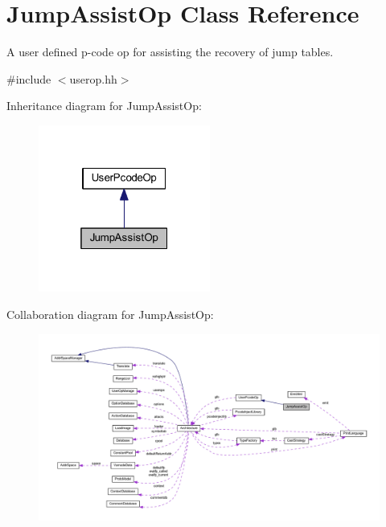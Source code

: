 \hypertarget{class_jump_assist_op}{}\section{Jump\+Assist\+Op Class Reference}
\label{class_jump_assist_op}


A user defined p-\/code op for assisting the recovery of jump tables.  




{\ttfamily \#include $<$userop.\+hh$>$}



Inheritance diagram for Jump\+Assist\+Op\+:
\nopagebreak
\begin{figure}[H]
\begin{center}
\leavevmode
\includegraphics[width=160pt]{class_jump_assist_op__inherit__graph}
\end{center}
\end{figure}


Collaboration diagram for Jump\+Assist\+Op\+:
\nopagebreak
\begin{figure}[H]
\begin{center}
\leavevmode
\includegraphics[width=350pt]{class_jump_assist_op__coll__graph}
\end{center}
\end{figure}
